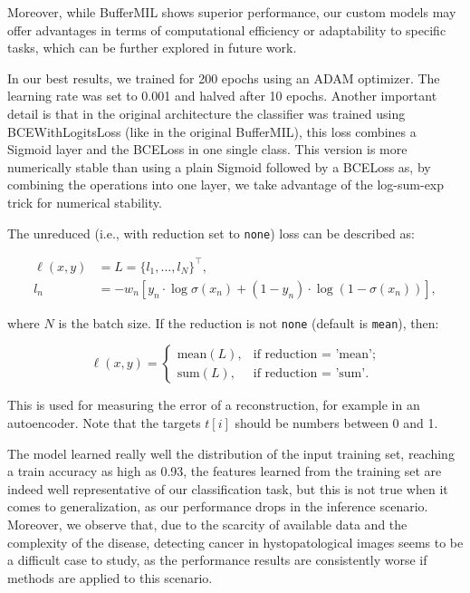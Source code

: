 \documentclass[10pt,twocolumn]{article}
\begin{document}
Moreover, while BufferMIL shows superior performance, our custom models may offer advantages in terms of computational efficiency or adaptability to specific tasks, which can be further explored in future work.


In our best results, we trained for 200 epochs using an ADAM optimizer. The learning rate was set to 0.001 and halved after 10 epochs. Another important detail is that in the original architecture the classifier was trained using BCEWithLogitsLoss (like in the original BufferMIL), this loss combines a Sigmoid layer and the BCELoss in one single class. This version is more numerically stable than using a plain Sigmoid followed by a BCELoss as, by combining the operations into one layer, we take advantage of the log-sum-exp trick for numerical stability.

The unreduced (i.e., with reduction set to \texttt{none}) loss can be described as:

\begin{align*}
\ell(x, y) &= L = \{l_1, \dots, l_N\}^\top, \\
l_n &= -w_n \left[ y_n \cdot \log \sigma(x_n) 
+ (1 - y_n) \cdot \log (1 - \sigma(x_n)) \right],
\end{align*}

where \( N \) is the batch size. If the reduction is not \texttt{none} (default is \texttt{mean}), then:

\[
\ell(x, y) = 
\begin{cases}
\text{mean}(L), & \text{if reduction = 'mean'}; \\
\text{sum}(L), & \text{if reduction = 'sum'}.
\end{cases}
\]

This is used for measuring the error of a reconstruction, for example in an autoencoder. Note that the targets \( t[i] \) should be numbers between 0 and 1.




The model learned really well the distribution of the input training set, reaching a train accuracy as high as 0.93, the features learned from the training set are indeed well representative of our classification task, but this is not true when it comes to generalization, as our performance drops in the inference scenario. Moreover, we observe that, due to the scarcity of available data and the complexity of the disease, detecting cancer in hystopatological images seems to be a difficult case to study, as the performance results are consistently worse if methods are applied to this scenario.
\end{document}
